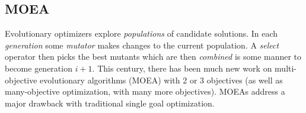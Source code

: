 \documentclass[10pt,journal,compsoc]{IEEEtran}
\newcommand{\bi}{\begin{itemize}}
\newcommand{\ei}{\end{itemize}}
\begin{document}

\subsection{MOEA}\label{sec:w}
Evolutionary optimizers explore {\em populations} of candidate solutions.
In each {\em generation} some {\em mutator} makes changes
to the current population. A {\em select} operator then picks the best mutants
which are then {\em combined} is some manner to become generation $i+1$.
This century, there has been much new work on
multi-objective evolutionary algorithms (MOEA) with 2 or 3 objectives
(as
well as many-objective optimization, with many more
objectives).   
MOEAs address a major drawback with traditional single goal
optimization.
\end{document}
